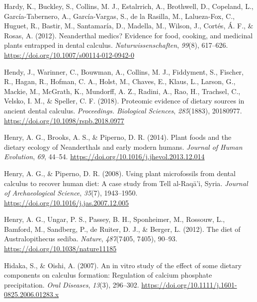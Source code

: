 \documentclass[
  letterpaper,
]{book}
\newlength{\cslhangindent}
\newlength{\cslentryspacingunit} %
\newenvironment{CSLReferences}[2] %
 {%
  \setlength{\parindent}{0pt}
  \ifodd #1
  \let\oldpar\par
  \def\par{\hangindent=\cslhangindent\oldpar}
  \fi
  \setlength{\parskip}{#2\cslentryspacingunit}
 }%
 {}
\begin{document}
\begin{CSLReferences}{1}{0}
\leavevmode{}%
Hardy, K., Buckley, S., Collins, M. J., Estalrrich, A., Brothwell, D.,
Copeland, L., García-Tabernero, A., García-Vargas, S., de la Rasilla,
M., Lalueza-Fox, C., Huguet, R., Bastir, M., Santamaría, D., Madella,
M., Wilson, J., Cortés, Á. F., \& Rosas, A. (2012). Neanderthal medics?
{Evidence} for food, cooking, and medicinal plants entrapped in dental
calculus. \emph{Naturwissenschaften}, \emph{99}(8), 617--626.
\url{https://doi.org/10.1007/s00114-012-0942-0}

\leavevmode{}%
Hendy, J., Warinner, C., Bouwman, A., Collins, M. J., Fiddyment, S.,
Fischer, R., Hagan, R., Hofman, C. A., Holst, M., Chaves, E., Klaus, L.,
Larson, G., Mackie, M., McGrath, K., Mundorff, A. Z., Radini, A., Rao,
H., Trachsel, C., Velsko, I. M., \& Speller, C. F. (2018). Proteomic
evidence of dietary sources in ancient dental calculus.
\emph{Proceedings. Biological Sciences}, \emph{285}(1883), 20180977.
\url{https://doi.org/10.1098/rspb.2018.0977}

\leavevmode{}%
Henry, A. G., Brooks, A. S., \& Piperno, D. R. (2014). Plant foods and
the dietary ecology of {Neanderthals} and early modern humans.
\emph{Journal of Human Evolution}, \emph{69}, 44--54.
\url{https://doi.org/10.1016/j.jhevol.2013.12.014}

\leavevmode{}%
Henry, A. G., \& Piperno, D. R. (2008). Using plant microfossils from
dental calculus to recover human diet: A case study from {Tell}
al-{Raqā}'i, {Syria}. \emph{Journal of Archaeological Science},
\emph{35}(7), 1943--1950.
\url{https://doi.org/10.1016/j.jas.2007.12.005}

\leavevmode{}%
Henry, A. G., Ungar, P. S., Passey, B. H., Sponheimer, M., Rossouw, L.,
Bamford, M., Sandberg, P., de Ruiter, D. J., \& Berger, L. (2012). The
diet of {Australopithecus} sediba. \emph{Nature}, \emph{487}(7405,
7405), 90--93. \url{https://doi.org/10.1038/nature11185}

\leavevmode{}%
Hidaka, S., \& Oishi, A. (2007). An in vitro study of the effect of some
dietary components on calculus formation: Regulation of calcium
phosphate precipitation. \emph{Oral Diseases}, \emph{13}(3), 296--302.
\url{https://doi.org/10.1111/j.1601-0825.2006.01283.x}


\end{CSLReferences}
\end{document}
